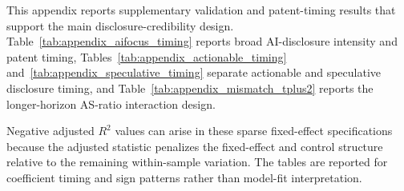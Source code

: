 This appendix reports supplementary validation and patent-timing results that support the main disclosure-credibility design. Table~\ref{tab:appendix_aifocus_timing} reports broad AI-disclosure intensity and patent timing, Tables~\ref{tab:appendix_actionable_timing} and~\ref{tab:appendix_speculative_timing} separate actionable and speculative disclosure timing, and Table~\ref{tab:appendix_mismatch_tplus2} reports the longer-horizon AS-ratio interaction design.

Negative adjusted $R^2$ values can arise in these sparse fixed-effect specifications because the adjusted statistic penalizes the fixed-effect and control structure relative to the remaining within-sample variation. The tables are reported for coefficient timing and sign patterns rather than model-fit interpretation.








